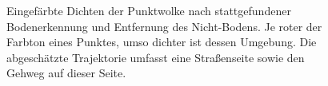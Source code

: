 \begin{figure}
    \hfill
    \caption{Eingefärbte Dichten der Punktwolke nach stattgefundener Bodenerkennung und Entfernung des Nicht-Bodens. Je roter der Farbton eines Punktes, umso dichter ist dessen Umgebung. Die abgeschätzte Trajektorie umfasst eine Straßenseite sowie den Gehweg auf dieser Seite.}
    \label{fig:colored_density}
\end{figure}

